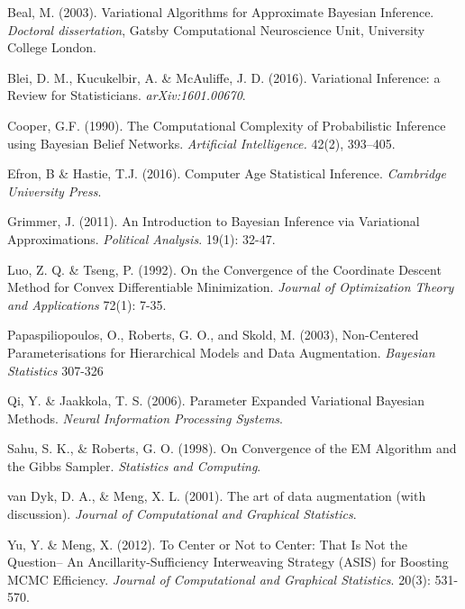 \documentclass{article}
\begin{document}
\begin{thebibliography}{10}

 Beal, M. (2003). Variational Algorithms for Approximate Bayesian Inference. {\sl Doctoral dissertation}, Gatsby Computational Neuroscience Unit, University College London.

 Blei, D. M., Kucukelbir, A. \& McAuliffe, J. D. (2016). Variational Inference: a Review for Statisticians. {\itshape arXiv:1601.00670}.

 Cooper, G.F. (1990). The Computational Complexity of Probabilistic Inference using Bayesian Belief Networks. {\sl Artificial Intelligence.} 42(2), 393–405.

 Efron, B \& Hastie, T.J. (2016). Computer Age Statistical Inference. {\itshape Cambridge University Press}.

 Grimmer, J. (2011). An Introduction to Bayesian Inference via Variational Approximations. {\itshape Political Analysis}. 19(1): 32-47.

 Luo, Z. Q. \& Tseng, P. (1992). On the Convergence of the Coordinate Descent Method for Convex Differentiable Minimization. {\itshape Journal of Optimization Theory and Applications} 72(1): 7-35. 

 Papaspiliopoulos, O., Roberts, G. O., and Skold, M. (2003), Non-Centered Parameterisations for Hierarchical Models and Data Augmentation. {\sl Bayesian Statistics} 307-326

 Qi, Y. \& Jaakkola, T. S. (2006). Parameter Expanded Variational Bayesian Methods. {\itshape Neural Information Processing Systems}. 

 Sahu, S. K., \& Roberts, G. O. (1998). On Convergence of the EM Algorithm and the Gibbs Sampler. {\sl Statistics
and Computing}. 

 van Dyk, D. A., \& Meng, X. L. (2001). The art of data augmentation (with discussion). {\sl Journal of Computational and Graphical Statistics}.

 Yu, Y. \& Meng, X. (2012). To Center or Not to Center: That Is Not the
Question-- An Ancillarity-Sufficiency Interweaving Strategy (ASIS) for Boosting MCMC Efficiency. {\itshape Journal of Computational and Graphical Statistics}. 20(3): 531-570. 
\end{thebibliography}

\newpage

\appendix
\end{document}
